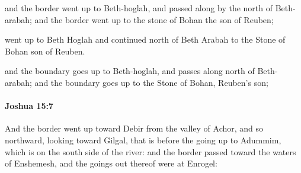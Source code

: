 			\begin{versebox}
					\item[BHS] 
					\item[ASV] and the border went up to Beth-hoglah, and passed along by the north of Beth-arabah; and the border went up to the stone of Bohan the son of Reuben;
					\item[NIV] went up to Beth Hoglah and continued north of Beth Arabah to the Stone of Bohan son of Reuben.
					\item[NRSV] and the boundary goes up to Beth-hoglah, and passes along north of Beth-arabah; and the boundary goes up to the Stone of Bohan, Reuben’s son;
			\end{versebox}

		\paragraph{Joshua 15:7} %
			\label{JOSHUA-15-7}

			And the border went up toward Debir from the valley of Achor, and so northward, looking toward Gilgal, that is before the going up to Adummim, which is on the south side of the river: and the border passed toward the waters of Enshemesh, and the goings out thereof were at Enrogel:


